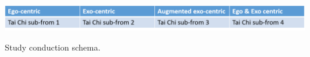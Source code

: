 \begin{table}
	\centering
	\includegraphics[width=1.0\textwidth]{img/studySetting.png}
	\caption{Study conduction schema.}
	\label{tbl:studySetting}
\end{table}

